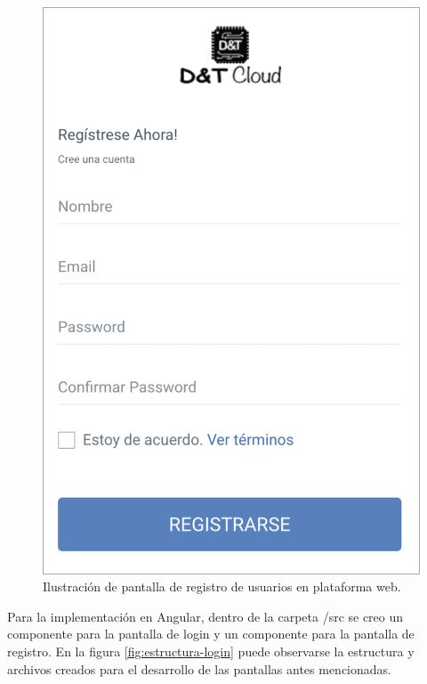 \begin{figure}[htpb]
	\centering
	\includegraphics[scale=.60]{./Figures/pantalla-register.png}
	\caption[Pantalla de registro de usuario]{Ilustración de pantalla de registro de usuarios en plataforma web.}
	\label{fig:pantalla-register}
\end{figure}


Para la implementación en Angular, dentro de la carpeta /src se creo un componente para la pantalla de login y un componente para la pantalla de registro. En la figura \ref{fig:estructura-login} puede observarse la estructura y archivos creados para el desarrollo de las pantallas antes mencionadas. 

